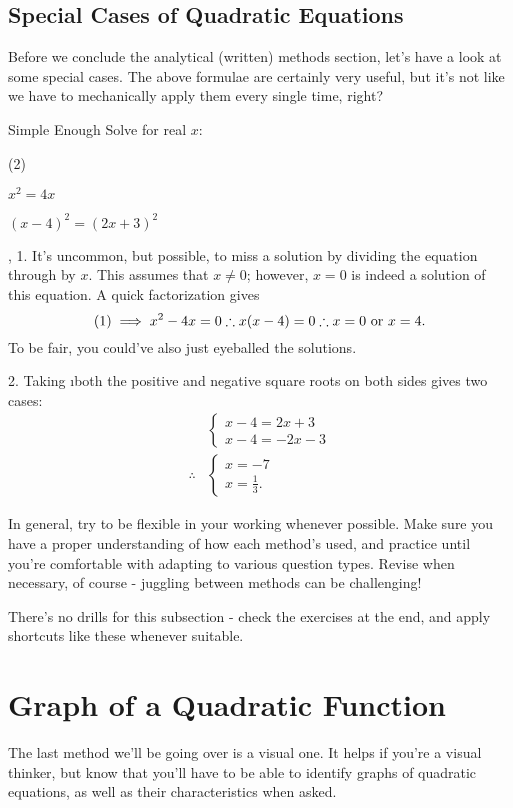 \subsection{Special Cases of Quadratic Equations}
Before we conclude the analytical (written) methods section, let's have a look at some special cases. The above formulae are certainly very useful, but it's not like we have to mechanically apply them every single time, right?
\begin{example}{Simple Enough}
Solve for real $x$:
\begin{question_set}(2)
    \item $x^2=4x$
    \item $(x-4)^2=(2x+3)^2$
\end{question_set}
\sep
1. It's uncommon, but possible, to miss a solution by dividing the equation through by $x$. This assumes that $x\neq0$; however, $x=0$ is indeed a solution of this equation. A quick factorization gives $$(1)\implies x^2-4x=0\therefore x(x-4)=0\therefore x=0\text{ or } x=4.$$
To be fair, you could've also just eyeballed the solutions.

2. Taking \i{both the positive and negative} square roots on both sides gives two cases:
\begin{align}
    &\begin{cases}x-4=2x+3\\x-4=-2x-3\end{cases} \\
    \therefore&\begin{cases}x=-7\\x=\frac13.\end{cases}
\end{align}
\end{example}
In general, try to be flexible in your working whenever possible. Make sure you have a proper understanding of how each method's used, and practice until you're comfortable with adapting to various question types. Revise when necessary, of course - juggling between methods can be challenging!


There's no drills for this subsection - check the exercises at the end, and apply shortcuts like these whenever suitable.

\section{Graph of a Quadratic Function}
The last method we'll be going over is a visual one. It helps if you're a visual thinker, but know that you'll have to be able to identify graphs of quadratic equations, as well as their characteristics when asked.

